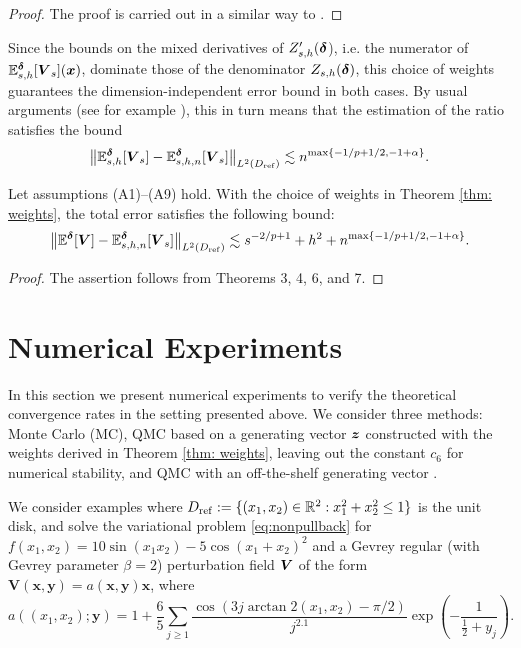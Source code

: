 \documentclass[graybox]{svmult}
\begin{document}
\begin{proof}
    The proof is carried out in a similar way to \cite[Theorem 6.4]{kss12}.
\end{proof}

Since the bounds on the mixed derivatives of $Z_{s,h}'({\boldsymbol{\delta}}$), i.e. the numerator of $\mathbb{E}_{s,h}^{{\boldsymbol{\delta}}}[{\boldsymbol{V}}_s]({\boldsymbol{x}})$, dominate those of the denominator $Z_{s,h}({\boldsymbol{\delta}})$, this choice of weights guarantees the dimension-independent error bound in both cases. By usual arguments (see for example \cite{BaKaLa24}), this in turn means that the estimation of the ratio satisfies the bound
$$
\big\| \mathbb{E}_{s,h}^{\boldsymbol{\delta}}[\boldsymbol{V}_s] -\mathbb{E}_{s,h,n}^{\boldsymbol{\delta}}[\boldsymbol{V}_s] \big\|_{L^2(D_{\rm ref})} \lesssim n^{\max\{ -1/p + 1/2, -1+\alpha\}}.
$$

\begin{theorem}
    Let assumptions {\rm (A1)--(A9)} hold. With the choice of weights in Theorem \ref{thm: weights}, the total error satisfies the following bound:
    $$
    \big\| \mathbb{E}^{\boldsymbol{\delta}}[\boldsymbol{V}] -\mathbb{E}_{s,h,n}^{\boldsymbol{\delta}}[\boldsymbol{V}_s]\big\|_{L^2(D_{\rm ref})} \lesssim s^{-2/p+1} + h^2 + n^{\max\{ -1/p + 1/2, -1+\alpha\}}.
    $$
\end{theorem}

\begin{proof}
    The assertion follows from Theorems 3, 4, 6, and 7.
\end{proof}

\section{Numerical Experiments}\label{sec:numex}

In this section we present numerical experiments to verify the theoretical convergence rates in the setting presented above. We consider three methods: Monte Carlo (MC), QMC based on a generating vector ${\boldsymbol{z}}$ constructed with the weights derived in Theorem \ref{thm: weights}, leaving out the constant $c_6$ for numerical stability, and QMC with an off-the-shelf generating vector \cite[\texttt{lattice-32001-1024-1048576.3600}]{Kuo24}. 

We consider examples where $D_{\rm ref} := \{ (x_1,x_2) \in \mathbb{R}^2 : x_1^2 + x_2^2 \leq 1 \}$ is the unit disk, and solve the variational problem \eqref{eq:nonpullback} for $f(x_1, x_2) = 10\sin(x_1 x_2) - 5\cos(x_1+x_2)^2$ and a Gevrey regular (with Gevrey parameter $\beta = 2$) perturbation field ${\boldsymbol{V}}$ of the form $\boldsymbol{V}(\boldsymbol{x}, \boldsymbol{y}) = a(\boldsymbol{x}, \boldsymbol{y}) \boldsymbol{x}$, where
\begin{equation*}
a((x_1,x_2);\boldsymbol{y}) = 1 + \frac{6}{5} \sum_{j\geq 1} \frac{\cos\left(3 j \arctan2(x_1,x_2) - \pi/2 \right)}{j^{2.1}} \exp\left(-\frac{1}{\frac12 + y_j}\right).
\end{equation*}
\end{document}

